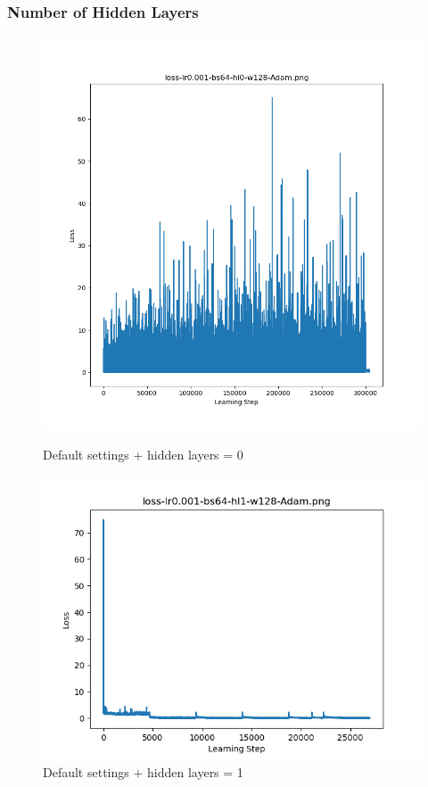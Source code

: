 \documentclass{article}[12pt]
\begin{document}
\subsubsection{Number of Hidden Layers}

    \begin{figure}[H]
        \includegraphics[width=\linewidth]{testsResults/loss/hl/hl0loss.png}
        \caption{Default settings + hidden layers = 0}
        \endminipage\hfill
        \includegraphics[width=\linewidth]{testsResults/loss/hl/loss-lr0.001-bs64-hl1-w128-Adam.png}
        \caption{Default settings + hidden layers = 1}
        \endminipage
    \end{figure}
\end{document}
